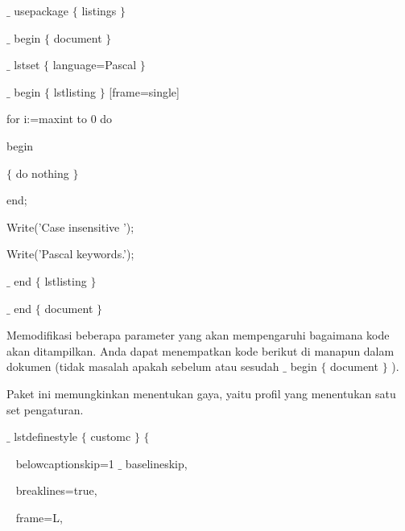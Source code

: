 \noindent  $ \_ $ usepackage $ \{ $ listings $ \} $ ~~~~~~~~~~~~ \par


\noindent  $ \_ $ begin $ \{ $ document $ \} $ \par


\noindent  $ \_ $ lstset $ \{ $ language=Pascal $ \} $ ~~~~~~~ \par


\noindent  $ \_ $ begin $ \{ $ lstlisting $ \} $ [frame=single]~ \par


\noindent for i:=maxint to 0 do\par


\noindent begin\par


\noindent  $ \{ $  do nothing  $ \} $ \par


\noindent end;\par


\noindent Write('Case insensitive ');\par


\noindent Write('Pascal keywords.');\par


\noindent  $ \_ $ end $ \{ $ lstlisting $ \} $ \par


\noindent 
\vspace{12pt}
\noindent  $ \_ $ end $ \{ $ document $ \} $ \par


\hspace{0.50in} Memodifikasi beberapa parameter yang akan mempengaruhi bagaimana kode akan ditampilkan. Anda dapat menempatkan kode berikut di manapun dalam dokumen (tidak masalah apakah sebelum atau sesudah  $ \_ $  begin  $ \{ $ document $ \} $ ). \par
\hspace{0.50in} Paket ini memungkinkan menentukan gaya, yaitu profil yang menentukan satu set pengaturan. \par
 $ \_ $ lstdefinestyle $ \{ $ customc $ \} $  $ \{ $ \par

{\fontsize{10pt}{10pt}\selectfont ~ belowcaptionskip=1 $ \_ $ baselineskip,}\par

{\fontsize{10pt}{10pt}\selectfont ~ breaklines=true,}\par

{\fontsize{10pt}{10pt}\selectfont ~ frame=L,}\par

